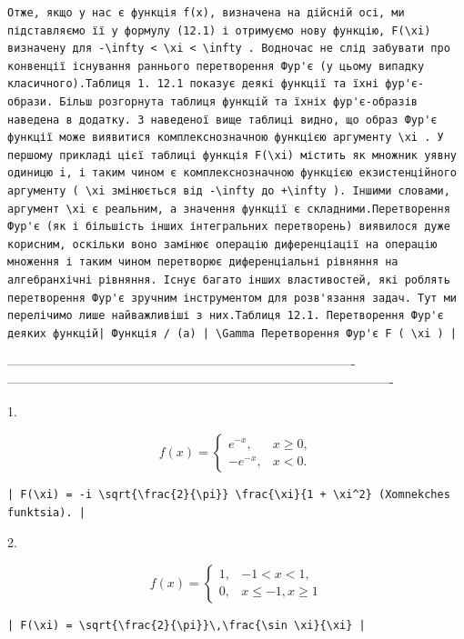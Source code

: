 \documentclass[
  ukrainian,
]{article}
\begin{document}
\begin{verbatim}
Отже, якщо у нас є функція f(x), визначена на дійсній осі, ми підставляємо її у формулу (12.1) і отримуємо нову функцію, F(\xi) визначену для -\infty < \xi < \infty . Водночас не слід забувати про конвенції існування раннього перетворення Фур'є (у цьому випадку класичного).Таблиця 1. 12.1 показує деякі функції та їхні фур'є-образи. Більш розгорнута таблиця функцій та їхніх фур'є-образів наведена в додатку. З наведеної вище таблиці видно, що образ Фур'є функції може виявитися комплекснозначною функцією аргументу \xi . У першому прикладі цієї таблиці функція F(\xi) містить як множник уявну одиницю i, і таким чином є комплекснозначною функцією екзистенційного аргументу ( \xi змінюється від -\infty до +\infty ). Іншими словами, аргумент \xi є реальним, а значення функції є складними.Перетворення Фур'є (як і більшість інших інтегральних перетворень) виявилося дуже корисним, оскільки воно замінює операцію диференціації на операцію множення і таким чином перетворює диференціальні рівняння на алгебранхічні рівняння. Існує багато інших властивостей, які роблять перетворення Фур'є зручним інструментом для розв'язання задач. Тут ми перелічимо лише найважливіші з них.Таблиця 12.1. Перетворення Фур'є деяких функцій| Функція / (a) | \Gamma Перетворення Фур'є F ( \xi ) |
\end{verbatim}

\textbar----------------------------------------------------------------------------------\textbar-------------------------------------------------------------------------------------------\textbar{}

1.

\[
f(x) = \begin{cases} e^{-x}, & x \ge 0, \\ -e^{-x}, & x < 0. \end{cases}
\]

\begin{verbatim}
| F(\xi) = -i \sqrt{\frac{2}{\pi}} \frac{\xi}{1 + \xi^2} (Xomnekches funktsia). |
\end{verbatim}

2.

\[
f(x) = \begin{cases} 1, & -1 < x < 1, \\ 0, & x \le -1, x \ge 1 \end{cases}
\]

\begin{verbatim}
| F(\xi) = \sqrt{\frac{2}{\pi}}\,\frac{\sin \xi}{\xi} |
\end{verbatim}
\end{document}
